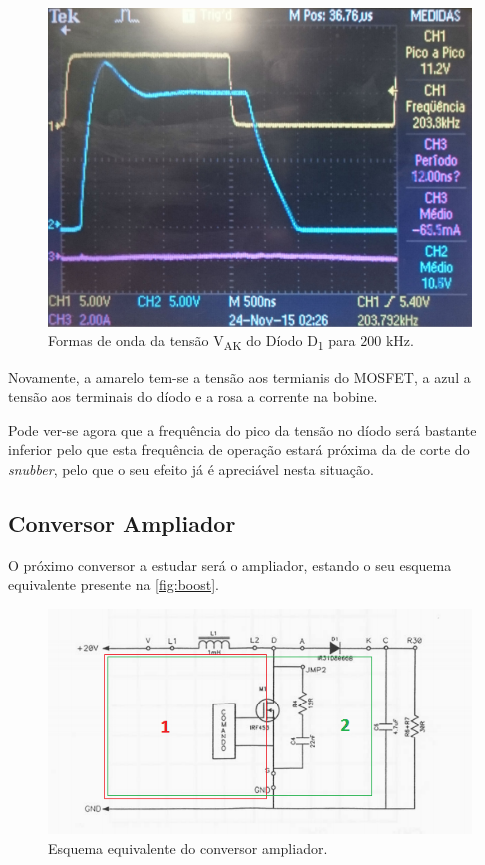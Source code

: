\documentclass[a4paper,11pt]{article}
\numberwithin{equation}{section}
\begin{document}
\begin{figure}[H]
	\centering
	\includegraphics[keepaspectratio=true, scale=0.14]{img/figs/vak_hf_buck}
	\caption{Formas de onda da tensão V\textsubscript{AK} do Díodo D\textsubscript{1} para $200$ kHz.}
	\label{fig:vak_hf_buck}
	\vspace{-0.8em}
\end{figure}

Novamente, a amarelo tem-se a tensão aos termianis do MOSFET, a azul a tensão aos terminais do díodo e a rosa a corrente na bobine.

Pode ver-se agora que a frequência do pico da tensão no díodo será bastante inferior pelo que esta frequência de operação estará próxima da de corte do \textit{snubber}, pelo que o seu efeito já é apreciável nesta situação.

\subsection{Conversor Ampliador}

O próximo conversor a estudar será o ampliador, estando o seu esquema equivalente presente na \autoref{fig:boost}.

\begin{figure}[H]
	\centering
	\includegraphics[keepaspectratio=true, scale=0.7]{teoricas/boost}
	\caption{Esquema equivalente do conversor ampliador.}
	\label{fig:boost}
	\vspace{-0.8em}
\end{figure}
\end{document}
